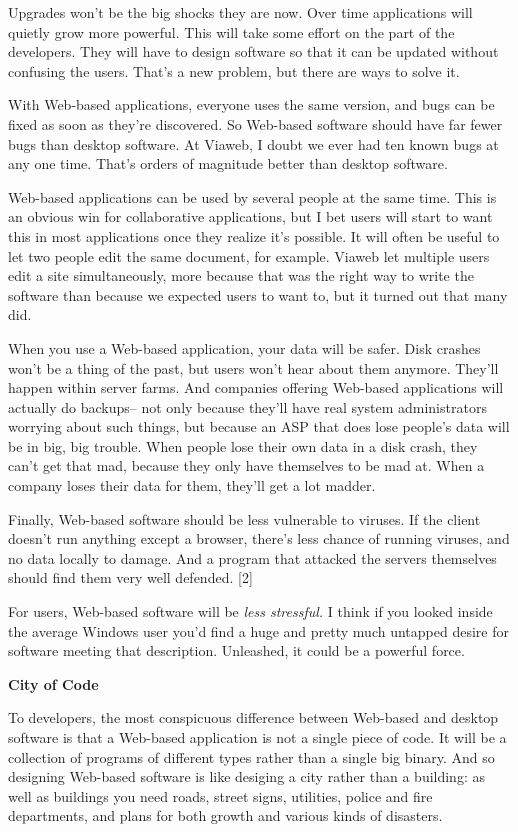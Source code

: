 Upgrades won't be the big shocks they are now. Over time applications
will quietly grow more powerful. This will take some effort on the part
of the developers. They will have to design software so that it can be
updated without confusing the users. That's a new problem, but there are
ways to solve it.

With Web-based applications, everyone uses the same version, and bugs
can be fixed as soon as they're discovered. So Web-based software should
have far fewer bugs than desktop software. At Viaweb, I doubt we ever
had ten known bugs at any one time. That's orders of magnitude better
than desktop software.

Web-based applications can be used by several people at the same time.
This is an obvious win for collaborative applications, but I bet users
will start to want this in most applications once they realize it's
possible. It will often be useful to let two people edit the same
document, for example. Viaweb let multiple users edit a site
simultaneously, more because that was the right way to write the
software than because we expected users to want to, but it turned out
that many did.

When you use a Web-based application, your data will be safer. Disk
crashes won't be a thing of the past, but users won't hear about them
anymore. They'll happen within server farms. And companies offering
Web-based applications will actually do backups-- not only because
they'll have real system administrators worrying about such things, but
because an ASP that does lose people's data will be in big, big trouble.
When people lose their own data in a disk crash, they can't get that
mad, because they only have themselves to be mad at. When a company
loses their data for them, they'll get a lot madder.

Finally, Web-based software should be less vulnerable to viruses. If the
client doesn't run anything except a browser, there's less chance of
running viruses, and no data locally to damage. And a program that
attacked the servers themselves should find them very well defended.
{[}2{]}

For users, Web-based software will be \emph{less stressful.} I think if
you looked inside the average Windows user you'd find a huge and pretty
much untapped desire for software meeting that description. Unleashed,
it could be a powerful force.

\textbf{City of Code}

To developers, the most conspicuous difference between Web-based and
desktop software is that a Web-based application is not a single piece
of code. It will be a collection of programs of different types rather
than a single big binary. And so designing Web-based software is like
desiging a city rather than a building: as well as buildings you need
roads, street signs, utilities, police and fire departments, and plans
for both growth and various kinds of disasters.


